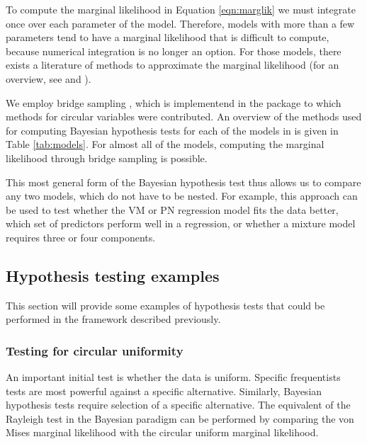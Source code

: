 \label{sec:bridge}

To compute the marginal likelihood in Equation \ref{eqn:marglik} we must
integrate once over each parameter of the model. Therefore, models with
more than a few parameters tend to have a marginal likelihood that is
difficult to compute, because numerical integration is no longer an
option. For those models, there exists a literature of methods to
approximate the marginal likelihood (for an overview, see
\citet{friel2012estimating} and \citet{ardia2012comparative}).

We employ bridge sampling
\citep{meng1996simulating, gronau2017tutorial}, which is implementend in
the package  \citep{gronau2017bridgesampling} to
which methods for circular variables were contributed. An overview of
the methods used for computing Bayesian hypothesis tests for each of the
models in  is given in Table \ref{tab:models}. For almost
all of the models, computing the marginal likelihood through bridge
sampling is possible.

This most general form of the Bayesian hypothesis test thus allows us to
compare any two models, which do not have to be nested. For example,
this approach can be used to test whether the VM or PN regression model
fits the data better, which set of predictors perform well in a
regression, or whether a mixture model requires three or four
components.

\hypertarget{hypothesis-testing-examples}{%
\subsection{Hypothesis testing
examples}\label{hypothesis-testing-examples}}

This section will provide some examples of hypothesis tests that could
be performed in the framework described previously.

\hypertarget{testing-for-circular-uniformity}{%
\subsubsection{Testing for circular
uniformity}\label{testing-for-circular-uniformity}}

An important initial test is whether the data is uniform. Specific
frequentists tests are most powerful against a specific alternative.
Similarly, Bayesian hypothesis tests require selection of a specific
alternative. The equivalent of the Rayleigh test
\citep{mardia2009directional, brazier1994confidence} in the Bayesian
paradigm can be performed by comparing the von Mises marginal likelihood
with the circular uniform marginal likelihood.

